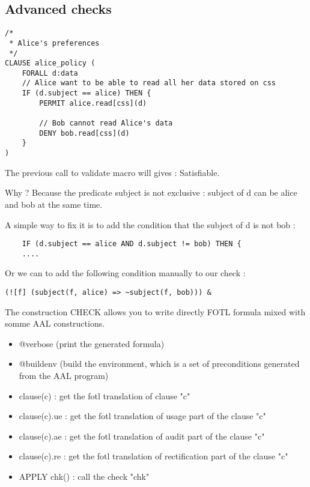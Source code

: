\subsection{Advanced checks}

\begin{lstlisting}
/*
 * Alice's preferences
 */
CLAUSE alice_policy (
    FORALL d:data
    // Alice want to be able to read all her data stored on css
    IF (d.subject == alice) THEN {
        PERMIT alice.read[css](d)

        // Bob cannot read Alice's data
        DENY bob.read[css](d)
    }
)
\end{lstlisting}
The previous call to validate macro will gives : Satisfiable.

Why ? Because the predicate subject is not exclusive :
subject of d can be alice and bob at the same time.

A simple way to fix it is to add the condition that the subject of d is not bob :
\begin{lstlisting}
    IF (d.subject == alice AND d.subject != bob) THEN {
    ....
\end{lstlisting}


Or we can to add the following condition manually to our check :
\begin{lstlisting}
(![f] (subject(f, alice) => ~subject(f, bob))) &
\end{lstlisting}

The construction CHECK allows you to write directly FOTL formula mixed with somme AAL constructions.

\begin{itemize}
    \item @verbose (print the generated formula)
    \item @buildenv (build the environment, which is a set of preconditions generated from the AAL program)
    \item clause(c) : get the fotl translation of clause "c"
    \item clause(c).ue : get the fotl translation of usage part of the clause "c"
    \item clause(c).ae : get the fotl translation of audit part of the clause "c"
    \item clause(c).re : get the fotl translation of rectification part of the clause "c"
    \item APPLY chk() : call the check "chk"
\end{itemize}

